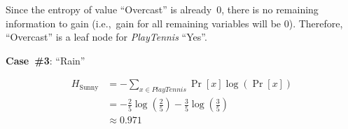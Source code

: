 Since the entropy of value ``Overcast'' is already~0, there is no remaining information to gain (i.e.,~gain for all remaining variables will be 0).  Therefore, ``Overcast'' is a leaf node for \textit{PlayTennis} ``Yes''.

\noindent
{\large \textbf{Case~\#3}: ``Rain''}

\begin{align*}
  H_{\text{Sunny}} &= -\sum_{x\in PlayTennis} \Pr[x] \log \left(\Pr[x]\right) \\
                   &= - \frac{2}{5} \log\left(\frac{2}{5}\right) - \frac{3}{5} \log\left(\frac{3}{5}\right) \\
                   &\approx 0.971
\end{align*}
